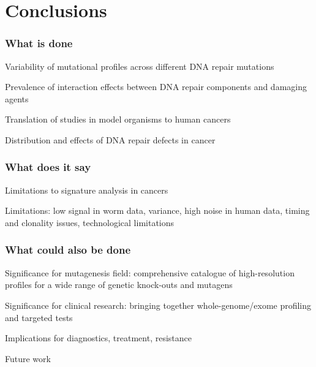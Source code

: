 

\pagestyle{empty}
\chapter{Conclusions}

\subsection*{What is done}

Variability of mutational profiles across different DNA repair mutations

Prevalence of interaction effects between DNA repair components and damaging agents

Translation of studies in model organisms to human cancers

Distribution and effects of DNA repair defects in cancer


\subsection*{What does it say}

Limitations to signature analysis in cancers

Limitations: low signal in worm data, variance, high noise in human data, timing and clonality issues, technological limitations

\subsection*{What could also be done}

Significance for mutagenesis field: comprehensive catalogue of high-resolution profiles for a wide range of genetic knock-outs and mutagens

Significance for clinical research: bringing together whole-genome/exome profiling and targeted tests

Implications for diagnostics, treatment, resistance

Future work






